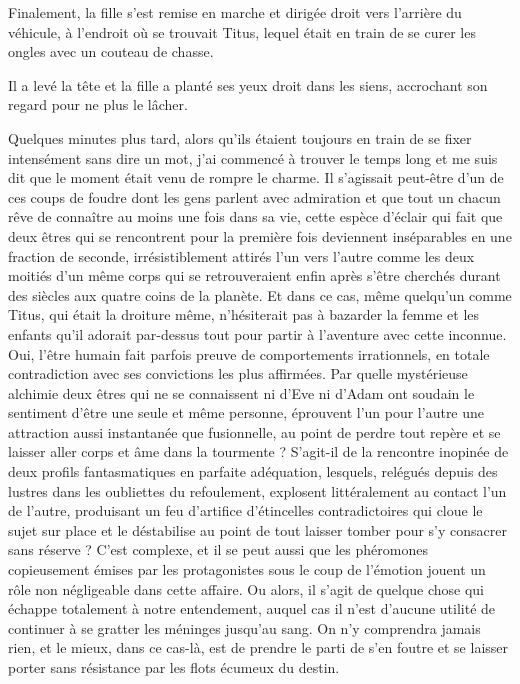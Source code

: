 Finalement, la fille s’est remise en marche et dirigée droit vers l’arrière du véhicule, à l’endroit où se trouvait Titus, lequel était en train de se curer les ongles avec un couteau de chasse.

Il a levé la tête et la fille a planté ses yeux droit dans les siens, accrochant son regard pour ne plus le lâcher.

Quelques minutes plus tard, alors qu’ils étaient toujours en train de se fixer intensément sans dire un mot, j’ai commencé à trouver le temps long et me suis dit que le moment était venu de rompre le charme. Il s’agissait peut-être d’un de ces coups de foudre dont les gens parlent avec admiration et que tout un chacun rêve de connaître au moins une fois dans sa vie, cette espèce d’éclair qui fait que deux êtres qui se rencontrent pour la première fois deviennent inséparables en une fraction de seconde, irrésistiblement attirés l’un vers l’autre comme les deux moitiés d’un même corps qui se retrouveraient enfin après s’être cherchés durant des siècles aux quatre coins de la planète. Et dans ce cas, même quelqu’un comme Titus, qui était la droiture même, n’hésiterait pas à bazarder la femme et les enfants qu’il adorait par-dessus tout pour partir à l’aventure avec cette inconnue. \label{rat:29}Oui, l’être humain fait parfois preuve de comportements irrationnels, en totale contradiction avec ses convictions les plus affirmées. Par quelle mystérieuse alchimie deux êtres qui ne se connaissent ni d’Eve ni d’Adam ont soudain le sentiment d’être une seule et même personne, éprouvent l’un pour l’autre une attraction aussi instantanée que fusionnelle, au point de perdre tout repère et se laisser aller corps et âme dans la tourmente ? S’agit-il de la rencontre inopinée de deux profils fantasmatiques en parfaite adéquation, lesquels, relégués depuis des lustres dans les oubliettes du refoulement, explosent littéralement au contact l’un de l’autre, produisant un feu d’artifice d’étincelles contradictoires qui cloue le sujet sur place et le déstabilise au point de tout laisser tomber pour s’y consacrer sans réserve ? C’est complexe, et il se peut aussi que les phéromones copieusement émises par les protagonistes sous le coup de l’émotion jouent un rôle non négligeable dans cette affaire. Ou alors, il s’agit de quelque chose qui échappe totalement à notre entendement, auquel cas il n’est d’aucune utilité de continuer à se gratter les méninges jusqu’au sang. On n’y comprendra jamais rien, et le mieux, dans ce cas-là, est de prendre le parti de s’en foutre et se laisser porter sans résistance par les flots écumeux du destin.

